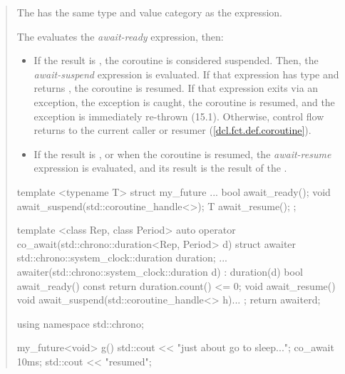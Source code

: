 \begin{quote}
\pnum The  has the same type and value category as the  expression.

\pnum The  evaluates the \textit{await-ready} expression, then:
\begin{itemize}
  \item If the result is , the coroutine is considered suspended. Then, the \textit{await-suspend} expression is evaluated. If that expression has type  and returns , the coroutine is resumed. If that expression exits via an exception, the exception is caught, the coroutine is resumed, and the exception is immediately re-thrown (15.1). Otherwise, control flow returns to the current caller or resumer (\ref{dcl.fct.def.coroutine}).
  \item If the result is , or when the coroutine is resumed, the \textit{await-resume} expression is evaluated, and its result is the result of the .
  
\end{itemize}

\pnum
\enterexample
\begin{codeblock}	
template <typename T>
struct my_future {
  ...
  bool await_ready();
  void await_suspend(std::coroutine_handle<>);
  T await_resume();
};
  
template <class Rep, class Period>
auto operator co_await(std::chrono::duration<Rep, Period> d) {
  struct awaiter {
    std::chrono::system_clock::duration duration;
    ...
    awaiter(std::chrono::system_clock::duration d) : duration(d){}
    bool await_ready() const { return duration.count() <= 0; }
    void await_resume() {}
    void await_suspend(std::coroutine_handle<> h){...}
  };
  return awaiter{d};
}

using namespace std::chrono;

my_future<void> g() {
  std::cout << "just about go to sleep...\n";
  co_await 10ms;
  std::cout << "resumed\n";
}
\end{codeblock}
\exitexample%

\end{quote}
%
%
